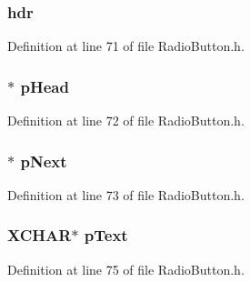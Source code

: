 \subsubsection[{hdr}]{ hdr}\label{struct_r_a_d_i_o_b_u_t_t_o_n_abeffaf353197a8a64fba6707b68ce0be}


Definition at line 71 of file Radio\+Button.\+h.

\hypertarget{struct_r_a_d_i_o_b_u_t_t_o_n_a55939b8f12cd7f69b5f7e06b5ec51d76}{}
\subsubsection[{p\+Head}]{$\ast$ p\+Head}\label{struct_r_a_d_i_o_b_u_t_t_o_n_a55939b8f12cd7f69b5f7e06b5ec51d76}


Definition at line 72 of file Radio\+Button.\+h.

\hypertarget{struct_r_a_d_i_o_b_u_t_t_o_n_ab37e3ec7793b9af61e3d3b35f3986fec}{}
\subsubsection[{p\+Next}]{$\ast$ p\+Next}\label{struct_r_a_d_i_o_b_u_t_t_o_n_ab37e3ec7793b9af61e3d3b35f3986fec}


Definition at line 73 of file Radio\+Button.\+h.

\hypertarget{struct_r_a_d_i_o_b_u_t_t_o_n_a934b5563cdaf14803728ff3a7b7e8c7f}{}
\subsubsection[{p\+Text}]{\setlength{\rightskip}{0pt plus 5cm}X\+C\+H\+A\+R$\ast$ p\+Text}\label{struct_r_a_d_i_o_b_u_t_t_o_n_a934b5563cdaf14803728ff3a7b7e8c7f}


Definition at line 75 of file Radio\+Button.\+h.

